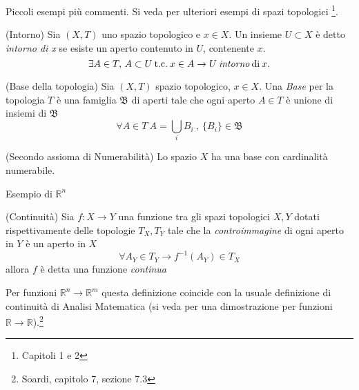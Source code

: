 Piccoli esempi più commenti. Si veda \cite{sernesi} per ulteriori esempi di spazi
topologici \footnote{Capitoli 1 e 2}.\\
\begin{definition}{(Intorno)}
   Sia $(X,T)$ uno spazio topologico e $x \in X$. Un insieme $U \subset X$ è detto
   \emph{intorno di x} se esiste un aperto contenuto in $U$, contenente $x$.
   $$ \exists A \in T, \, A \subset U \:\mathrm{t.c.}\: x \in A \rightarrow U \:
   \mathrm{ \emph{intorno} \: di } \: x.$$
\end{definition}
\begin{definition}{(Base della topologia)}
   Sia $(X,T)$ spazio topologico, $x \in X$. Una \emph{Base} per la topologia $T$
   è una famiglia $\mathfrak{B}$ di aperti tale che ogni aperto $A \in T$
   è unione di insiemi di $\mathfrak{B}$
   $$ \forall A \in T \: A = \bigcup \limits_i B_i \: , \: \{B_i\} \in \mathfrak{B}$$
\end{definition}
\begin{definition}{(Secondo assioma di Numerabilità)}
\label{def:IInumerabile}
   Lo spazio $X$ ha una base con cardinalità numerabile.
\end{definition}
Esempio di $\mathbb{R}^n$
 \begin{definition}{(Continuità)}
    Sia $f:X \to Y$ una funzione tra gli spazi topologici $X,Y$ dotati rispettivamente
    delle topologie $T_X, T_Y$ tale che la \emph{controimmagine} di ogni aperto in $Y$
    è un aperto in $X$
    $$\forall A_Y \in T_Y \rightarrow f^{-1}(A_Y) \in T_X$$
    allora $f$ è detta una funzione \emph{continua}
 \end{definition}
Per funzioni $\mathbb{R}^n \to \mathbb{R}^m$ questa definizione coincide con
la usuale definizione di continuità di Analisi Matematica (si veda \cite{soardi} per una
dimostrazione per funzioni $\mathbb{R} \to \mathbb{R}$).\footnote{Soardi, capitolo 7, sezione 7.3}\\

